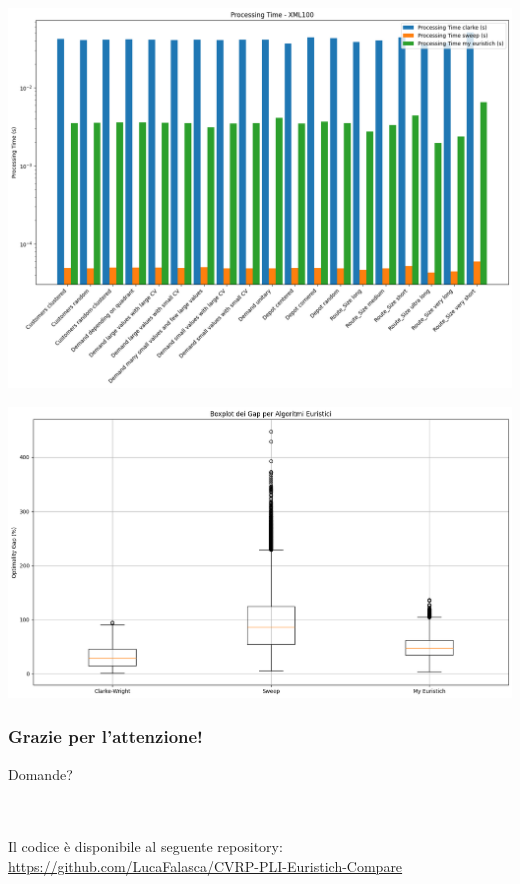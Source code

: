 \documentclass[compress]{beamer}
\begin{document}
\begin{frame}{\subsecname}
    \begin{center}
		\begin{minipage}{1\textwidth}
            \centering
            \includegraphics[width=0.8\linewidth]{images/xml100_time.png}
        \end{minipage}
    \end{center}
\end{frame}

\begin{frame}{\subsecname}
    \begin{center}
		\begin{minipage}{1\textwidth}
            \centering
            \includegraphics[width=1\linewidth]{images/xml100_boxplot.png}
        \end{minipage}
    \end{center}
\end{frame}

\begin{frame}
	\frametitle{Grazie per l'attenzione!}
	\begin{Huge}
		Domande?
	\end{Huge} 
	\\ \\
	Il codice è disponibile al seguente repository: \url{https://github.com/LucaFalasca/CVRP-PLI-Euristich-Compare}
	\\ \\
	
\end{frame}
\end{document}
